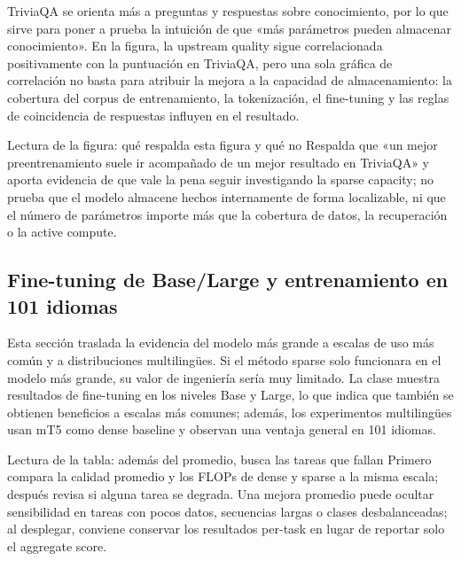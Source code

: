 TriviaQA se orienta más a preguntas y respuestas sobre conocimiento, por lo que sirve para poner a prueba la intuición de que «más parámetros pueden almacenar conocimiento». En la figura, la upstream quality sigue correlacionada positivamente con la puntuación en TriviaQA, pero una sola gráfica de correlación no basta para atribuir la mejora a la capacidad de almacenamiento: la cobertura del corpus de entrenamiento, la tokenización, el fine-tuning y las reglas de coincidencia de respuestas influyen en el resultado.


\begin{knowledgebox}{Lectura de la figura: qué respalda esta figura y qué no}
Respalda que «un mejor preentrenamiento suele ir acompañado de un mejor resultado en TriviaQA» y aporta evidencia de que vale la pena seguir investigando la sparse capacity; no prueba que el modelo almacene hechos internamente de forma localizable, ni que el número de parámetros importe más que la cobertura de datos, la recuperación o la active compute.
\end{knowledgebox}

\subsection{Fine-tuning de Base/Large y entrenamiento en 101 idiomas}

Esta sección traslada la evidencia del modelo más grande a escalas de uso más común y a distribuciones multilingües. Si el método sparse solo funcionara en el modelo más grande, su valor de ingeniería sería muy limitado. La clase muestra resultados de fine-tuning en los niveles Base y Large, lo que indica que también se obtienen beneficios a escalas más comunes; además, los experimentos multilingües usan mT5 como dense baseline y observan una ventaja general en 101 idiomas.


\begin{knowledgebox}{Lectura de la tabla: además del promedio, busca las tareas que fallan}
Primero compara la calidad promedio y los FLOPs de dense y sparse a la misma escala; después revisa si alguna tarea se degrada. Una mejora promedio puede ocultar sensibilidad en tareas con pocos datos, secuencias largas o clases desbalanceadas; al desplegar, conviene conservar los resultados per-task en lugar de reportar solo el aggregate score.
\end{knowledgebox}

